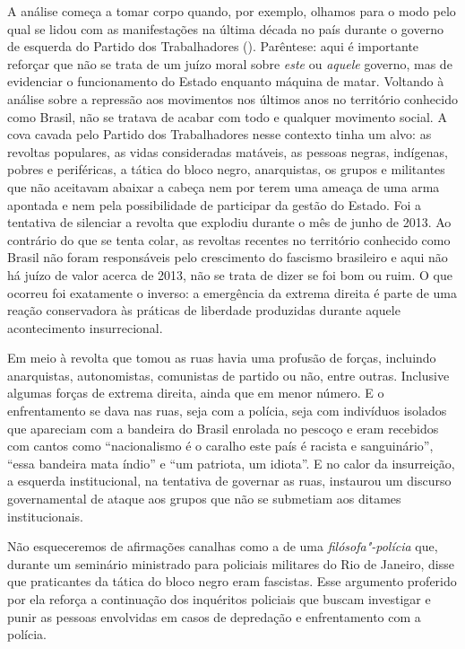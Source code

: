A análise começa a tomar corpo quando, por exemplo, olhamos para o modo
pelo qual se lidou com as manifestações na última década no país durante
o governo de esquerda do Partido dos Trabalhadores (). Parêntese: aqui
é importante reforçar que não se trata de um juízo moral sobre
\emph{este} ou \emph{aquele} governo, mas de evidenciar o funcionamento
do Estado enquanto máquina de matar. Voltando à análise sobre a
repressão aos movimentos nos últimos anos no território conhecido como
Brasil, não se tratava de acabar com todo e qualquer movimento social. A
cova cavada pelo Partido dos Trabalhadores nesse contexto tinha um alvo:
as revoltas populares, as vidas consideradas matáveis, as pessoas
negras, indígenas, pobres e periféricas, a tática do bloco negro,
anarquistas, os grupos e militantes que não aceitavam abaixar a cabeça
nem por terem uma ameaça de uma arma apontada e nem pela possibilidade
de participar da gestão do Estado. Foi a tentativa de silenciar a
revolta que explodiu durante o mês de junho de 2013. Ao contrário do que
se tenta colar, as revoltas recentes no território conhecido como Brasil
não foram responsáveis pelo crescimento do fascismo brasileiro e aqui
não há juízo de valor acerca de 2013, não se trata de dizer se foi bom
ou ruim. O que ocorreu foi exatamente o inverso: a emergência da
extrema direita é parte de uma reação conservadora às práticas de
liberdade produzidas durante aquele acontecimento insurrecional.

Em meio à revolta que tomou as ruas havia uma profusão de forças,
incluindo anarquistas, autonomistas, comunistas de partido ou não, entre
outras. Inclusive algumas forças de extrema direita, ainda que em menor
número. E o enfrentamento se dava nas ruas, seja com a polícia, seja com
indivíduos isolados que apareciam com a bandeira do Brasil enrolada no
pescoço e eram recebidos com cantos como ``nacionalismo é o caralho este
país é racista e sanguinário'', ``essa bandeira mata índio'' e ``um
patriota, um idiota''. E no calor da insurreição, a esquerda
institucional, na tentativa de governar as ruas, instaurou um discurso
governamental de ataque aos grupos que não se submetiam aos ditames
institucionais.

Não esqueceremos de afirmações canalhas como a de uma
\emph{filósofa"-polícia} que, durante um seminário ministrado para
policiais militares do Rio de Janeiro, disse que praticantes da tática
do bloco negro eram fascistas. Esse argumento proferido por ela reforça
a continuação dos inquéritos policiais que buscam investigar e punir as
pessoas envolvidas em casos de depredação e enfrentamento com a polícia.

